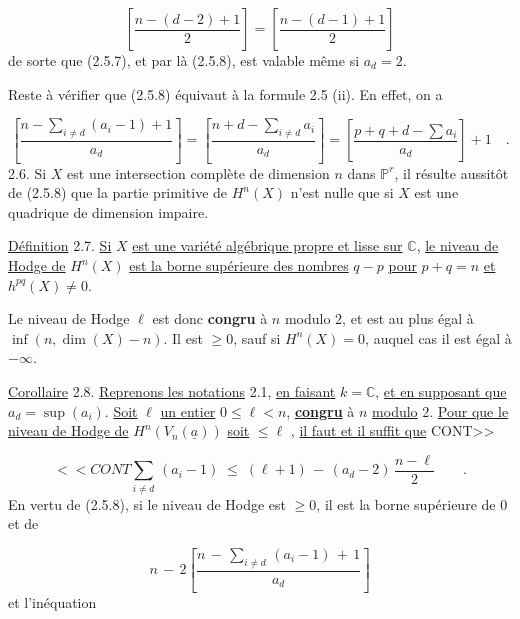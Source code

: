 \begin{equation*}
\left[ \displaystyle\frac{n - (d-2) + 1}{2} \right] = \left[ \displaystyle\frac{n - (d-1) + 1}{2} \right]
\end{equation*}
de sorte que (2.5.7), et par là (2.5.8), est valable même si $a_d = 2$.

Reste à vérifier que (2.5.8) équivaut à la formule 2.5 (ii). En effet, on a

\begin{equation*}
\left[ \displaystyle\frac{n - \sum\limits_{i \neq d} (a_i-1) + 1}{a_d} \right] = \left[ \displaystyle\frac{n + d - \sum\limits_{i \neq d} a_i}{a_d} \right] = \left[ \displaystyle\frac{p + q + d - \sum a_i}{a_d} \right] + 1 \quad .
\end{equation*}
2.6. \quad Si $X$ est une intersection complète de dimension $n$ dans $\mathbb{P}^r$, il résulte aussitôt de (2.5.8) que la partie primitive de $H^n(X)$ n'est nulle que si $X$ est une quadrique de dimension impaire.

\underline{Définition} 2.7. \underline{Si} $X$ \underline{est une variété algébrique propre et lisse sur} $\mathbb{C}$, \underline{le niveau de Hodge de} $H^n(X)$ \underline{est la borne supérieure des nombres} $q-p$ \underline{pour} $p+q = n$ \underline{et} $h^{pq}(X) \neq 0$.

Le niveau de Hodge $\ell$ est donc \textbf{congru} à $n$ modulo $2$, et est au plus égal à $\inf(n,\dim(X) - n)$. Il est $\geq 0$, sauf si $H^n(X) = 0$, auquel cas il est égal à $- \infty$.

\underline{Corollaire} 2.8. \underline{Reprenons les notations} 2.1, \underline{en faisant} $k = \mathbb{C}$, \underline{et en supposant que} $a_d = \sup (a_i)$. \underline{Soit} $\ell$ \underline{un entier} $0 \leq \ell < n$, \underline{\textbf{congru}} à $n$ \underline{modulo} $2$. \underline{Pour que le niveau de Hodge de} $H^n(V_n(\underline{a}))$ \underline{soit} $\leq \ell$ , \underline{il faut et il suffit que} CONT>>



\begin{equation*}
<<CONT \sum_{i \neq d} \, (a_i - 1) \;\leq\; (\ell + 1) \, - \, (a_d - 2) \, \frac{n - \ell}{2} \qquad .
\end{equation*}
En vertu de (2.5.8), si le niveau de Hodge est $\geq 0$, il est la borne supérieure de 0 et de

\begin{equation*}
n \, - \, 2 \left[ \frac{n \, - \, \sum_{i \neq d} \, (a_i - 1) \, + \, 1}{a_d} \right]
\end{equation*}
et l'inéquation


